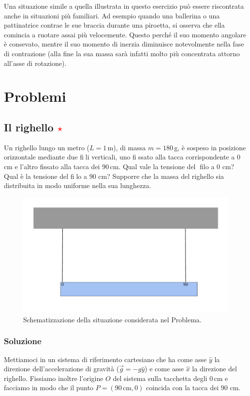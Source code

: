 \documentclass[12pt,a4paper]{book}
\newcommand{\rstar}{ \textcolor{red}{$\star$}}
\begin{document}
Una situazione simile a quella illustrata in questo esercizio può essere riscontrata anche in situazioni più familiari. Ad esempio quando 
una ballerina o una pattinatrice contrae le sue braccia durante una piroetta, si osserva che ella comincia a ruotare assai più velocemente. Questo perché il suo momento
angolare è consevato, mentre il suo momento di inerzia diminuisce notevolmente nella fase di contrazione (alla fine la sua massa sarà infatti molto più concentrata attorno
all'asse di rotazione). \\

\newpage

\section{Problemi}
\subsection{Il righello \rstar}
Un righello lungo un metro ($L=1\,$m), di massa $m=180\,$g, è sospeso in posizione orizzontale mediante due fili verticali, uno fissato alla tacca corrispondente a $0\,$cm e l'altro fissato alla tacca dei $90\,$cm. Qual vale la tensione del filo a 0 cm? Qual è la tensione del filo a 90 cm? Supporre che la massa del righello sia distribuita in modo uniforme nella sua lunghezza. 

\begin{figure}[!ht]
 \centering
\includegraphics[scale=0.45]{righello1.pdf}
\caption{Schematizzazione della situazione considerata nel Problema. \label{fig:righello1} }
\end{figure}


\subsubsection*{Soluzione}
Mettiamoci in un sistema di riferimento cartesiano che ha come asse $\hat{y}$ la direzione dell'accelerazione di gravità
($\vec{g}=-g\hat{y}$) e come asse $\hat{x}$ la direzione del righello. Fissiamo inoltre l'origine $O$ del sistema sulla tacchetta
degli $0\,$cm e facciamo in modo che il punto $P=(90\,\text{cm},0)$ coincida con la tacca dei 90 cm. \\
\end{document}

